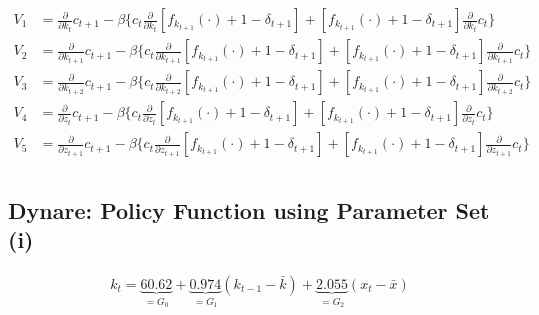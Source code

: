 \documentclass[a4paper]{article}
\theoremstyle{definition}
\begin{document}
	\begin{align*}
	V_1 	&= \frac{\partial}{\partial k_t}c_{t+1} - \beta \Big\{ c_t \frac{\partial}{\partial k_t}[f_{k_{t+1}}(\cdot)+1-\delta_{t+1}] + [f_{k_{t+1}}(\cdot)+1-\delta_{t+1}]\frac{\partial}{\partial k_t}c_t \Big\} \\
	V_2 	&= \frac{\partial}{\partial k_{t+1}}c_{t+1} - \beta \Big\{ c_t \frac{\partial}{\partial k_{t+1}}[f_{k_{t+1}}(\cdot)+1-\delta_{t+1}] + [f_{k_{t+1}}(\cdot)+1-\delta_{t+1}]\frac{\partial}{\partial k_{t+1}}c_t \Big\} \\
	V_3 	&= \frac{\partial}{\partial k_{t+2}}c_{t+1} - \beta \Big\{ c_t \frac{\partial}{\partial k_{t+2}}[f_{k_{t+1}}(\cdot)+1-\delta_{t+1}] + [f_{k_{t+1}}(\cdot)+1-\delta_{t+1}]\frac{\partial}{\partial k_{t+2}}c_t \Big\} \\	
	V_4 	&= \frac{\partial}{\partial z_{t}}c_{t+1} - \beta \Big\{ c_t \frac{\partial}{\partial z_{t}}[f_{k_{t+1}}(\cdot)+1-\delta_{t+1}] + [f_{k_{t+1}}(\cdot)+1-\delta_{t+1}]\frac{\partial}{\partial z_{t}}c_t \Big\} \\		
	V_5 	&= \frac{\partial}{\partial z_{t+1}}c_{t+1} - \beta \Big\{ c_t \frac{\partial}{\partial z_{t+1}}[f_{k_{t+1}}(\cdot)+1-\delta_{t+1}] + [f_{k_{t+1}}(\cdot)+1-\delta_{t+1}]\frac{\partial}{\partial z_{t+1}}c_t \Big\} \\		
	\end{align*}	
%
%
%
%
%
%
%
%
%
%
%
%
%
%
%
%
\newpage
\subsection{Dynare: Policy Function using Parameter Set (i)}
	\begin{align*}
	k_t = \underbrace{60.62}_{=G_0} + \underbrace{0.974}_{=G_1} (k_{t-1}-\bar k) + \underbrace{2.055}_{=G_2} (x_t-\bar x)
	\end{align*}
\end{document}
